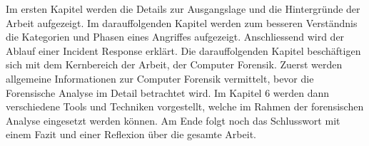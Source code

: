 Im ersten Kapitel werden die Details zur Ausgangslage und die Hintergründe der Arbeit aufgezeigt. Im darauffolgenden Kapitel werden zum besseren Verständnis die Kategorien und Phasen eines Angriffes aufgezeigt. Anschliessend wird der Ablauf einer Incident Response erklärt. Die darauffolgenden Kapitel beschäftigen sich mit dem Kernbereich der Arbeit, der Computer Forensik. Zuerst werden allgemeine Informationen zur Computer Forensik vermittelt, bevor die Forensische Analyse im Detail betrachtet wird. Im Kapitel 6 werden dann verschiedene Tools und Techniken vorgestellt, welche im Rahmen der forensischen Analyse eingesetzt werden können. Am Ende folgt noch das Schlusswort mit einem Fazit und einer Reflexion über die gesamte Arbeit.

